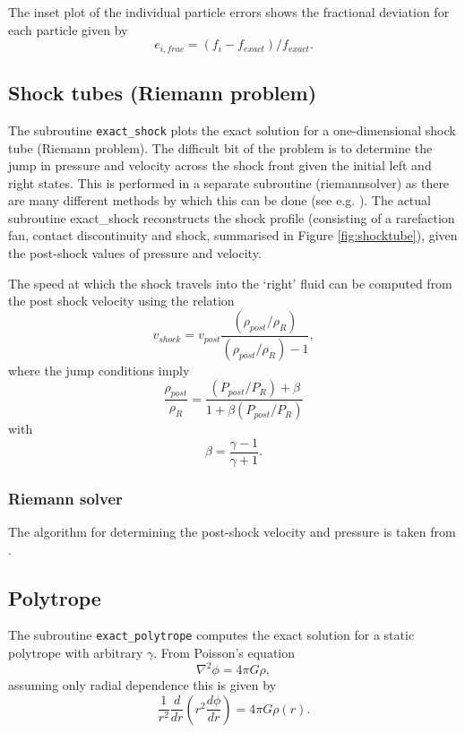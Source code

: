 \documentclass[a4paper,11pt]{article}
\begin{document}
 The inset plot of the individual particle errors shows the fractional deviation for
 each particle given by
\begin{equation}
e_{i,frac} = (f_i - f_{exact}) / f_{exact}.
\end{equation}

\subsection{Shock tubes (Riemann problem)}
 The subroutine \verb+exact_shock+ plots the exact solution for a one-dimensional shock tube
(Riemann problem). The difficult bit of the problem is to determine the jump in
pressure and velocity across the shock front given the initial left and right
states. This is performed in a separate subroutine (riemannsolver) as there are 
many different methods by which this can be done (see e.g. \citealt{toro92}). 
The actual subroutine exact\_shock reconstructs the shock profile (consisting of
a rarefaction fan, contact discontinuity and shock, summarised in Figure
\ref{fig:shocktube}), given the post-shock values of pressure and
velocity. 

 The speed at which the shock travels into the `right' fluid can be computed from the post shock
velocity using the relation
\begin{equation}
v_{shock} = v_{post}\frac{(\rho_{post}/\rho_R)}{(\rho_{post}/\rho_R)- 1},
\end{equation}
where the jump conditions imply
\begin{equation}
\frac{\rho_{post}}{\rho_R} = \frac{(P_{post}/P_R) + \beta}{1 + \beta (P_{post}/P_R)}
\end{equation}
with
\begin{equation}
\beta = \frac{\gamma - 1}{\gamma + 1}.
\end{equation}

\subsubsection{Riemann solver}
 The algorithm for determining the post-shock velocity and pressure is taken
from \citet{toro92}.

\subsection{Polytrope}
 The subroutine \verb+exact_polytrope+ computes the exact solution for a static polytrope with
arbitrary $\gamma$. From Poisson's equation
\begin{equation}
\nabla^2 \phi = 4\pi G \rho,
\end{equation}
assuming only radial dependence this is given by
\begin{equation}
\frac{1}{r^{2}} \frac{d}{dr} \left(r^{2} \frac{d\phi}{dr} \right) = 4\pi G \rho(r).
\label{eq:poissonsph}
\end{equation}
  
\end{document}
